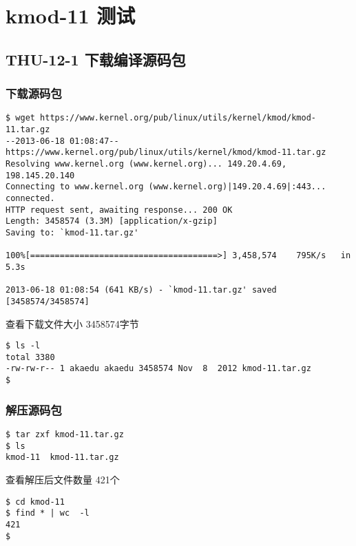 \documentclass[11pt,a4paper]{article}
\begin{document}
\section{kmod-11 测试}

\subsection{THU-12-1 下载编译源码包}

\subsubsection{下载源码包}

{\begin{shaded}\begin{verbatim}
$ wget https://www.kernel.org/pub/linux/utils/kernel/kmod/kmod-11.tar.gz
--2013-06-18 01:08:47--  https://www.kernel.org/pub/linux/utils/kernel/kmod/kmod-11.tar.gz
Resolving www.kernel.org (www.kernel.org)... 149.20.4.69, 198.145.20.140
Connecting to www.kernel.org (www.kernel.org)|149.20.4.69|:443... connected.
HTTP request sent, awaiting response... 200 OK
Length: 3458574 (3.3M) [application/x-gzip]
Saving to: `kmod-11.tar.gz'

100%[======================================>] 3,458,574    795K/s   in 5.3s    

2013-06-18 01:08:54 (641 KB/s) - `kmod-11.tar.gz' saved [3458574/3458574]
\end{verbatim}\end{shaded}}
查看下载文件大小 3458574字节

{\begin{shaded}\begin{verbatim}
$ ls -l
total 3380
-rw-rw-r-- 1 akaedu akaedu 3458574 Nov  8  2012 kmod-11.tar.gz
$ 
\end{verbatim}\end{shaded}}
\subsubsection{解压源码包}

{\begin{shaded}\begin{verbatim}
$ tar zxf kmod-11.tar.gz 
$ ls
kmod-11  kmod-11.tar.gz
\end{verbatim}\end{shaded}}
查看解压后文件数量 421个

{\begin{shaded}\begin{verbatim}
$ cd kmod-11
$ find * | wc  -l
421
$ 
\end{verbatim}\end{shaded}}
\end{document}
